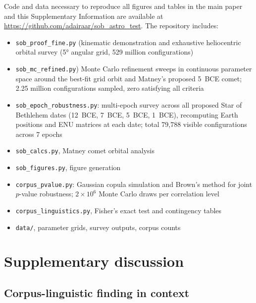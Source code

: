\documentclass[11pt,a4paper]{article}
\begin{document}
Code and data necessary to reproduce all figures and tables in the main
paper and this Supplementary Information are available at \url{https://github.com/adairaar/sob_astro_test}.
The repository includes:
\begin{itemize}
  \item \texttt{sob\_proof\_fine.py} (kinematic demonstration and exhaustive heliocentric orbital survey (5° angular grid, 529 million configurations)
  \item \texttt{sob\_mc\_refined.py}) Monte Carlo refinement sweeps in continuous parameter space around the best-fit grid orbit and Matney's proposed 5~BCE comet; 2.25 million configurations sampled, zero satisfying all criteria
  \item \texttt{sob\_epoch\_robustness.py}: multi-epoch survey across all
    proposed Star of Bethlehem dates (12~BCE, 7~BCE, 5~BCE, 1~BCE), recomputing
    Earth positions and ENU matrices at each date;
    total 79,788 visible configurations across 7 epochs
  \item \texttt{sob\_calcs.py}, Matney comet orbital analysis
  \item \texttt{sob\_figures.py}, figure generation
  \item \texttt{corpus\_pvalue.py}: Gaussian copula simulation and Brown's
    method for joint $p$-value robustness; $2\times10^6$ Monte Carlo draws
    per correlation level
  \item \texttt{corpus\_linguistics.py}, Fisher's exact test and
    contingency tables
  \item \texttt{data/}, parameter grids, survey outputs, corpus counts
\end{itemize}

\section*{Supplementary discussion}

\subsection{Corpus-linguistic finding in context}
\label{subsec:supp_ling_context}
\end{document}
